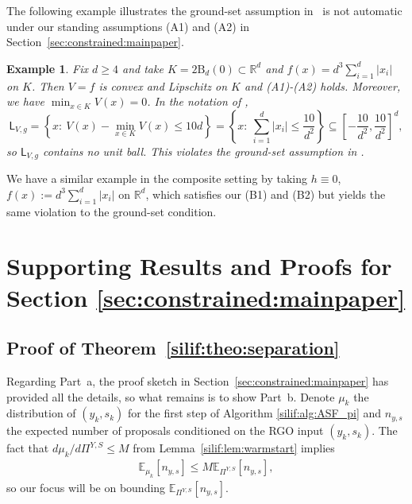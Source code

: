 \documentclass[11pt,letterpaper]{article}
\newcommand{\ball}{\mathrm{B}}
\newcommand{\R}{\mathbb{R}}
\newcommand{\E}{\mathbb{E}}
\newtheorem{example}[thm]{Example}
\begin{document}





The following example illustrates the ground-set assumption in~\cite[beginning of Sec.~2.1]{kook2025algodiffusion} is not automatic under our standing assumptions (A1) and (A2) in Section~\ref{sec:constrained:mainpaper}. 
\begin{example}
\label{ex:groundset}
Fix $d\ge 4$ and take $K=2\ball_{d}(0)\subset\R^d$ and $f(x)=d^3\sum_{i=1}^d|x_i|$ on $K$. Then $V=f$ is convex and Lipschitz on $K$ and (A1)-(A2) holds. Moreover, we have  $\min_{x\in K}V(x)=0$. In the notation of \cite{kook2025algodiffusion},
\[
\mathsf L_{V,g}
=\left\{x:\ V(x)-\min_{x\in K}V(x)\le 10d \right\}
=\left\{x:\ \sum_{i=1}^d |x_i|\le \frac{10}{d^2}\right\}
\subseteq \left[-\frac{10}{d^2},\frac{10}{d^2}\right]^d,
\]
so $\mathsf L_{V,g}$ contains no unit ball. This violates the ground-set assumption in \cite{kook2025algodiffusion}. 
\end{example}
We have a similar example in the composite setting by taking $h\equiv 0$, $f(x):=d^3\sum_{i=1}^d |x_i|$ on $\R^d$, which satisfies our (B1) and (B2) but yields the same violation to the ground-set condition.

\section{Supporting Results and Proofs for Section \ref{sec:constrained:mainpaper}}


\subsection{Proof of Theorem~\ref{silif:theo:separation}}
\label{silif:appen:sepatheoproof}
 
 Regarding Part~a, the proof sketch in Section~\ref{sec:constrained:mainpaper} has provided all the details, so what remains is to show Part~b. Denote $\mu_k$ the distribution of $(y_k,s_k)$ for the first step of Algorithm \ref{silif:alg:ASF_pi} and $n_{y,s}$ the expected number of proposals conditioned on the RGO input $(y_k,s_k)$. The fact that $d\mu_k/d\Pi^{Y,S}\leq M$ from Lemma~\ref{silif:lem:warmstart} implies 
\begin{align}
\label{silif:sepawarmstartimplication}
	\E_{\mu_k}[n_{y,s}] \le M \E_{\Pi^{Y,S}}[n_{y,s}], 
\end{align}
so our focus will be on bounding $\E_{\Pi^{Y,S}}[n_{y,s}]$.
 
\end{document}
